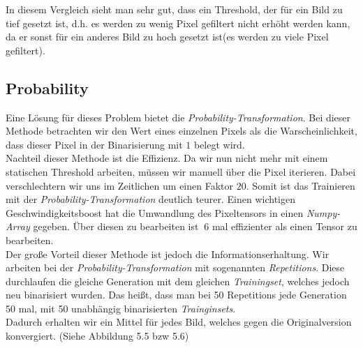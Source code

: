 In diesem Vergleich sieht man sehr gut, dass ein Threshold, der für ein Bild zu tief gesetzt ist, d.h. es werden zu wenig Pixel gefiltert nicht erhöht werden kann, da er sonst für ein anderes Bild zu hoch gesetzt ist(es werden zu viele Pixel gefiltert).\\

\subsection{Probability}

Eine Lösung für dieses Problem bietet die \textit{Probability-Transformation}. Bei dieser Methode betrachten wir den Wert eines einzelnen Pixels als die Warscheinlichkeit, dass dieser Pixel in der Binarisierung mit $1$ belegt wird.\\

Nachteil dieser Methode ist die Effizienz. Da wir nun nicht mehr mit einem statischen Threshold arbeiten, müssen wir manuell über die Pixel iterieren. Dabei verschlechtern wir uns im Zeitlichen um einen Faktor $20$. Somit ist das Trainieren mit der \textit{Probability-Transformation} deutlich teurer. Einen wichtigen Geschwindigkeitsboost hat die Umwandlung des Pixeltensors in einen \textit{Numpy-Array} gegeben. Über diesen zu bearbeiten ist $~6$ mal effizienter als einen Tensor zu bearbeiten.\\

Der große Vorteil dieser Methode ist jedoch die Informationserhaltung. Wir arbeiten bei der \textit{Probability-Transformation} mit sogenannten \textit{Repetitions}. Diese durchlaufen die gleiche Generation mit dem gleichen \textit{Trainingset}, welches jedoch neu binarisiert wurden. Das heißt, dass man bei 50 Repetitions jede Generation 50 mal, mit 50 unabhängig binarisierten \textit{Trainginsets}.\\Dadurch erhalten wir ein Mittel für jedes Bild, welches gegen die Originalversion konvergiert. (Siehe Abbildung 5.5 bzw 5.6)

